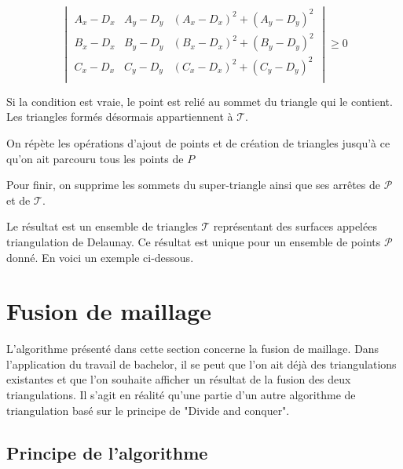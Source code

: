 $$
\begin{vmatrix}
 A_x - D_x & A_y - D_y & (A_x - D_x)^2 + (A_y - D_y)^2 \\
 B_x - D_x & B_y - D_y & (B_x - D_x)^2 + (B_y - D_y)^2 \\
 C_x - D_x & C_y - D_y & (C_x - D_x)^2 + (C_y - D_y)^2 \\
\end{vmatrix} \geqslant 0
$$

Si la condition est vraie, le point est relié au sommet du triangle qui le contient. Les triangles formés désormais appartiennent à $\mathcal{T}$.

On répète les opérations d'ajout de points et de création de triangles jusqu'à ce qu'on ait parcouru tous les points de $P$

Pour finir, on supprime les sommets du super-triangle ainsi que ses arrêtes de $\mathcal{P}$ et de $\mathcal{T}$.

Le résultat est un ensemble de triangles $\mathcal{T}$ représentant des surfaces appelées triangulation de Delaunay.
Ce résultat est unique pour un ensemble de points $\mathcal{P}$ donné.
En voici un exemple ci-dessous.

\section{Fusion de maillage}

L'algorithme présenté dans cette section concerne la fusion de maillage. Dans l'application du travail de bachelor, il se peut que l'on ait déjà des triangulations existantes et que l'on souhaite afficher un résultat de la fusion des deux triangulations. Il s'agit en réalité qu'une partie d'un autre algorithme de triangulation basé sur le principe de "Divide and conquer".

\subsection{Principe de l'algorithme}

